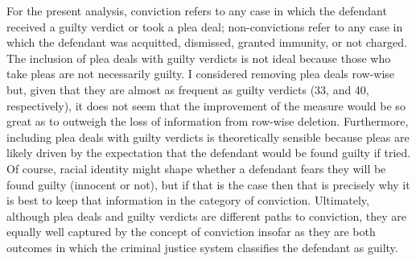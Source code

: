 \documentclass[12pt,article]{article}
\begin{document}
For the present analysis, conviction refers to any case in which the
defendant received a guilty verdict or took a plea deal; non-convictions
refer to any case in which the defendant was acquitted, dismissed,
granted immunity, or not charged. The inclusion of plea deals with guilty verdicts is not ideal because those who take pleas are not necessarily guilty. I considered removing plea deals row-wise but, given that they are almost as frequent as guilty verdicts (33, and 40, respectively), it does not seem that the improvement of the measure would be so great as to outweigh the loss of information from row-wise deletion. Furthermore, including plea deals with guilty verdicts is theoretically sensible because pleas are likely driven by the expectation that the defendant would be found guilty if tried. Of course, racial identity might shape whether a defendant fears they will be found guilty (innocent or not), but if that is the case then that is precisely why it is best to keep that information in the category of conviction. Ultimately, although plea deals and guilty verdicts are different paths to conviction, they are equally well captured by the concept of conviction insofar as they are both outcomes in which the criminal justice system classifies the defendant as guilty.
  
\pagebreak

\singlespacing
\end{document}
